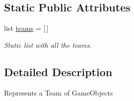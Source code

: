 \subsection*{\-Static \-Public \-Attributes}
\begin{DoxyCompactItemize}
\item 
\hypertarget{classTeam_1_1Team_a2a381be35594f58355daa36609d5d327}{list \hyperlink{classTeam_1_1Team_a2a381be35594f58355daa36609d5d327}{teams} = \mbox{[}$\,$\mbox{]}}\label{classTeam_1_1Team_a2a381be35594f58355daa36609d5d327}

\begin{DoxyCompactList}\small\item\em \-Static list with all the teams. \end{DoxyCompactList}\end{DoxyCompactItemize}


\subsection{\-Detailed \-Description}
\begin{DoxyVerb}Represents a Team of GameObjects\end{DoxyVerb}
 

